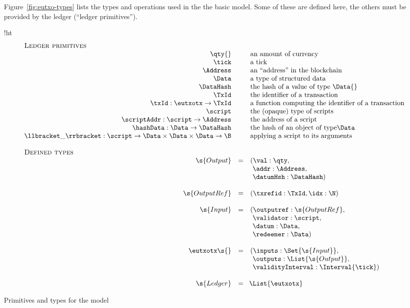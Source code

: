 Figure~\ref{fig:eutxo-types} lists the types and operations used in the
the basic \EUTXO{} model. Some of these are defined here, the others must be provided by
the ledger (``ledger primitives'').
\begin{ruledfigure}{!ht}
  \begin{displaymath}
  \begin{array}{rll}
    \multicolumn{3}{l}{\textsc{Ledger primitives}}\\
    \qty{} && \mbox{an amount of currency}\\
    \tick && \mbox{a tick}\\
    \Address && \mbox{an ``address'' in the blockchain}\\
    \Data && \mbox{a type of structured data}\\
    \DataHash && \mbox{the hash of a value of type \Data{}}\\
    \TxId && \mbox{the identifier of a transaction}\\
    \txId : \eutxotx \rightarrow \TxId && \mbox{a function computing the identifier of a transaction}\\
    \script && \mbox{the (opaque) type of scripts}\\
    \scriptAddr : \script \rightarrow \Address && \mbox{the address of a script}\\
    \hashData : \Data \rightarrow \DataHash && \mbox{the hash of an object of type\Data}\\
    \llbracket \_ \rrbracket : \script \rightarrow \Data \times \Data \times
    \Data \rightarrow \B && \mbox{applying a script to its arguments}\\
    \\
    \multicolumn{3}{l}{\textsc{Defined types}}\\
    \s{Output } &=&(\val: \qty,\\
                & &\ \addr: \Address,\\
                & &\ \datumHsh: \DataHash)\\
    \\
    \s{OutputRef } &=&(\txrefid: \TxId, \idx: \N)\\
    \\
    \s{Input } &=&(\outputref: \s{OutputRef},\\
               & &\ \validator: \script,\\
               & &\ \datum: \Data,\\
               & &\ \redeemer: \Data)\\
     \\
     \eutxotx\s{ } &=&(\inputs: \Set{\s{Input}},\\
                   & &\ \outputs: \List{\s{Output}},\\
                   & &\ \validityInterval: \Interval{\tick})\\
     \\
     \s{Ledger } &=&\!\List{\eutxotx}\\
  \end{array}
  \end{displaymath}
  \caption{Primitives and types for the \EUTXO{} model}
  \label{fig:eutxo-types}
\end{ruledfigure}

